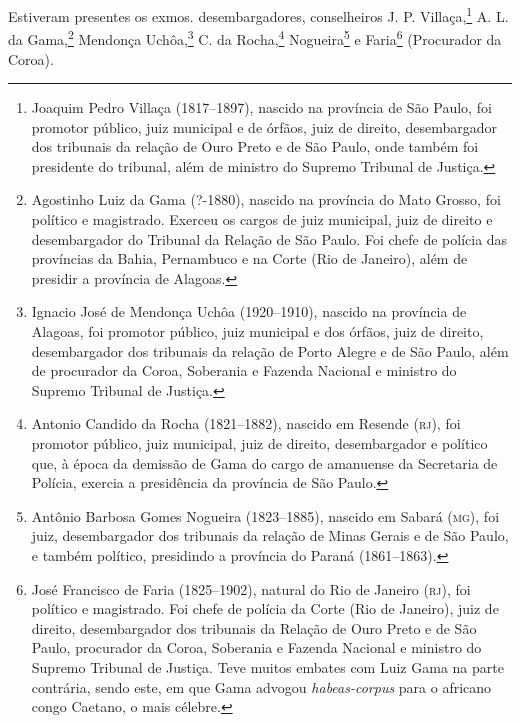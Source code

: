 Estiveram presentes os exmos. desembargadores, conselheiros J. P.
Villaça,\footnote{Joaquim Pedro Villaça (1817--1897), nascido na
  província de São Paulo, foi promotor público, juiz municipal e de
  órfãos, juiz de direito, desembargador dos tribunais da relação de
  Ouro Preto e de São Paulo, onde também foi presidente do tribunal,
  além de ministro do Supremo Tribunal de Justiça.} A. L. da 
Gama,\footnote{Agostinho Luiz da Gama (?-1880), nascido na província do
  Mato Grosso, foi político e magistrado. Exerceu os cargos de juiz
  municipal, juiz de direito e desembargador do Tribunal da Relação de
  São Paulo. Foi chefe de polícia das províncias da Bahia, Pernambuco e
  na Corte (Rio de Janeiro), além de presidir a província de Alagoas.}
Mendonça Uchôa,\footnote{Ignacio José de Mendonça Uchôa (1920--1910),
  nascido na província de Alagoas, foi promotor público, juiz municipal
  e dos órfãos, juiz de direito, desembargador dos tribunais da relação
  de Porto Alegre e de São Paulo, além de procurador da Coroa, Soberania
  e Fazenda Nacional e ministro do Supremo Tribunal de Justiça.} C. da
Rocha,\footnote{Antonio Candido da Rocha (1821--1882), nascido em
  Resende (\textsc{rj}), foi promotor público, juiz municipal, juiz de direito,
  desembargador e político que, à época da demissão de Gama do cargo de
  amanuense da Secretaria de Polícia, exercia a presidência da província
  de São Paulo.} Nogueira\footnote{Antônio Barbosa Gomes Nogueira
  (1823--1885), nascido em Sabará (\textsc{mg}), foi juiz, desembargador dos
  tribunais da relação de Minas Gerais e de São Paulo, e também
  político, presidindo a província do Paraná (1861--1863).} e
Faria\footnote{José Francisco de Faria (1825--1902), natural do Rio de \label{jff}
  Janeiro (\textsc{rj}), foi político e magistrado. Foi chefe de polícia da Corte
  (Rio de Janeiro), juiz de direito, desembargador dos tribunais da
  Relação de Ouro Preto e de São Paulo, procurador da Coroa, Soberania e
  Fazenda Nacional e ministro do Supremo Tribunal de Justiça. Teve
  muitos embates com Luiz Gama na parte contrária, sendo este, em que
  Gama advogou \emph{habeas-corpus} para o africano congo Caetano, o
  mais célebre.} (Procurador da Coroa).

